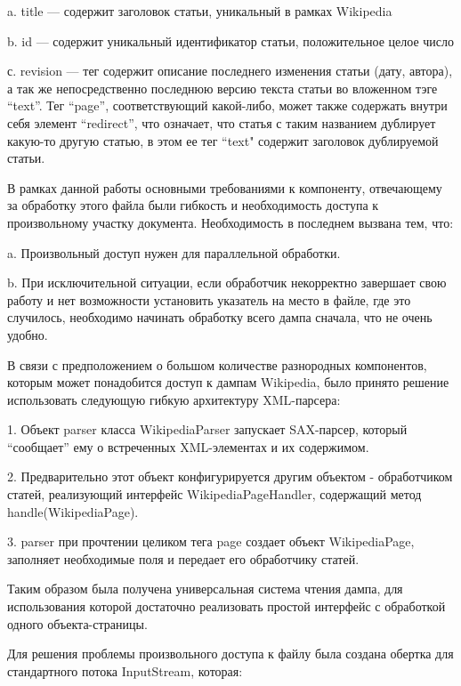 a. title --- содержит заголовок статьи, уникальный в рамках Wikipedia

b. id --- содержит уникальный идентификатор статьи, положительное целое число

с. revision --- тег содержит описание последнего изменения статьи (дату, автора), 
а так же непосредственно последнюю версию текста статьи во вложенном тэге ``text''. 
Тег ``page'', соответствующий какой-либо, может также содержать внутри себя %
элемент “redirect”, что означает, что статья с таким названием дублирует 
какую-то другую статью, в этом ее тег ``text" содержит заголовок дублируемой статьи. 

В рамках данной работы основными требованиями к компоненту, отвечающему 
за обработку этого файла были гибкость и необходимость доступа к произвольному участку документа.
Необходимость в последнем вызвана тем, что:

a. Произвольный доступ нужен для параллельной обработки.

b. При исключительной ситуации, если обработчик некорректно завершает свою работу и 
нет возможности установить указатель на место в файле, где это случилось,
необходимо начинать обработку всего дампа сначала, что не очень удобно.

В связи с предположением о большом количестве разнородных компонентов,
которым может понадобится доступ к дампам Wikipedia, было принято решение 
использовать следующую гибкую архитектуру XML-парсера:

1. Объект parser класса WikipediaParser запускает SAX-парсер, который “сообщает” 
ему о встреченных XML-элементах и их содержимом.

2. Предварительно этот объект конфигурируется другим объектом - обработчиком статей,
 реализующий интерфейс WikipediaPageHandler, содержащий метод handle(WikipediaPage).

3. parser при прочтении целиком тега page создает объект WikipediaPage, заполняет 
необходимые поля и передает его обработчику статей.


Таким образом была получена универсальная система чтения дампа, для использования которой 
достаточно реализовать простой интерфейс с обработкой одного объекта-страницы.

Для решения проблемы произвольного доступа к файлу была создана обертка для стандартного потока InputStream, которая:

